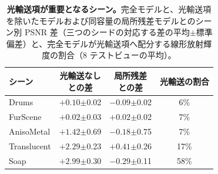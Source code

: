 \begin{table}[t]
\caption{\textbf{光輸送項が重要となるシーン。}完全モデルと、光輸送項を除いたモデルおよび同容量の局所残差モデルとのシーン別 PSNR 差（三つのシードの対応する差の平均$\pm$標準偏差）と、完全モデルが光輸送項へ配分する線形放射輝度の割合（8 テストビューの平均）。}
\label{tab:paired}
\centering\small
\setlength{\tabcolsep}{2.5pt}
\begin{tabular}{@{}lccc@{}}
\toprule
シーン & \shortstack{光輸送なし\\との差} & \shortstack{局所残差\\との差} & 光輸送の割合 \\
\midrule
Drums & $+0.10${\tiny$\pm$0.02} & $-0.09${\tiny$\pm$0.02} & 6\% \\
FurScene & $+0.02${\tiny$\pm$0.03} & $+0.02${\tiny$\pm$0.02} & 7\% \\
AnisoMetal & $+1.42${\tiny$\pm$0.69} & $-0.18${\tiny$\pm$0.75} & 7\% \\
Translucent & $+2.29${\tiny$\pm$0.23} & $+0.41${\tiny$\pm$0.26} & 17\% \\
Soap & $+2.99${\tiny$\pm$0.30} & $-0.29${\tiny$\pm$0.11} & 58\% \\
\bottomrule
\end{tabular}
\end{table}
